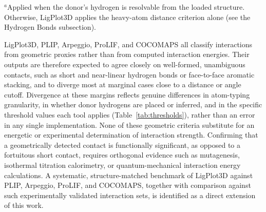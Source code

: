 \documentclass[lettersize,journal]{IEEEtran}
\begin{document}
\begin{table}[htbp]
\centering
\caption{LigPlot3D geometric thresholds compared with PLIP's default configuration \cite{plipconfig}. The two tools are independently parameterized and their thresholds are not intended to be identical.}
\label{tab:thresholds}

\footnotesize $^{a}$Applied when the donor's hydrogen is resolvable from the loaded structure. Otherwise, LigPlot3D applies the heavy-atom distance criterion alone (see the Hydrogen Bonds subsection).
\end{table}

LigPlot3D, PLIP, Arpeggio, ProLIF, and COCOMAPS all classify interactions from geometric proxies rather than from computed interaction energies. Their outputs are therefore expected to agree closely on well-formed, unambiguous contacts, such as short and near-linear hydrogen bonds or face-to-face aromatic stacking, and to diverge most at marginal cases close to a distance or angle cutoff. Divergence at these margins reflects genuine differences in atom-typing granularity, in whether donor hydrogens are placed or inferred, and in the specific threshold values each tool applies (Table~\ref{tab:thresholds}), rather than an error in any single implementation. None of these geometric criteria substitute for an energetic or experimental determination of interaction strength. Confirming that a geometrically detected contact is functionally significant, as opposed to a fortuitous short contact, requires orthogonal evidence such as mutagenesis, isothermal titration calorimetry, or quantum-mechanical interaction energy calculations. A systematic, structure-matched benchmark of LigPlot3D against PLIP, Arpeggio, ProLIF, and COCOMAPS, together with comparison against such experimentally validated interaction sets, is identified as a direct extension of this work.
\end{document}
